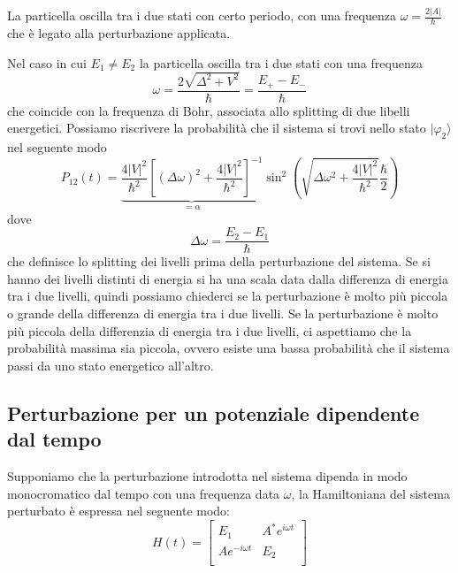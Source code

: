 \noindent La particella oscilla tra i due stati con certo periodo, con una frequenza $\omega = \frac{2|A|}{\hbar}$
che \`e legato alla perturbazione applicata.
\newline

Nel caso in cui $E_1 \neq E_2$ la particella oscilla tra i due stati con una frequenza 
\begin{equation*}
	\omega = \frac{2 \sqrt {\Delta^2 +V^2}}{\hbar} = \frac{E_+ -E_-}{\hbar}
\end{equation*}
che coincide con la frequenza di Bohr, associata allo splitting di due libelli energetici. Possiamo riscrivere la probabilit\`a che il sistema si trovi nello stato $|\varphi_2 \rangle$ nel seguente modo
\begin{equation*}
	P_{12}(t) = \underbrace{\frac{4|V|^2}{\hbar^2} \left [ (\Delta \omega)^2 + \frac{4|V|^2}{\hbar^2	}\right ]^{-1}}_{ = \alpha} \sin^2 \left( \sqrt{\Delta \omega^2 + \frac{4|V|^2}{\hbar^2}} \frac{\hbar}{2} \right)
\end{equation*}
dove 
\begin{equation*}
	\Delta\omega = \frac{E_2 - E_1}{\hbar}
\end{equation*}
che definisce lo splitting dei livelli prima della perturbazione del sistema. Se si hanno dei livelli distinti di energia si ha una scala data dalla differenza di energia tra i due livelli, quindi possiamo chiederci se la perturbazione \`e molto pi\`u piccola o grande della differenza di energia tra i due livelli.  Se la perturbazione \`e molto pi\`u piccola della differenzia di energia tra i due livelli, ci aspettiamo che la probabilit\`a massima sia piccola, ovvero esiste una bassa probabilit\`a che il sistema passi da uno stato energetico all'altro.
\newpage 


\subsection{Perturbazione per un potenziale dipendente dal tempo }

Supponiamo che la perturbazione introdotta nel sistema dipenda in modo monocromatico dal tempo con una frequenza data $\omega$, la Hamiltoniana del sistema perturbato \`e espressa nel seguente modo:
\begin{equation*}
	H(t) = \left [ \begin{array}{cc}
		E_1 & A^*e^{i\omega t} \\
		Ae^{-i\omega t} & E_2 \\ 
	\end{array} \right ]
\end{equation*}

